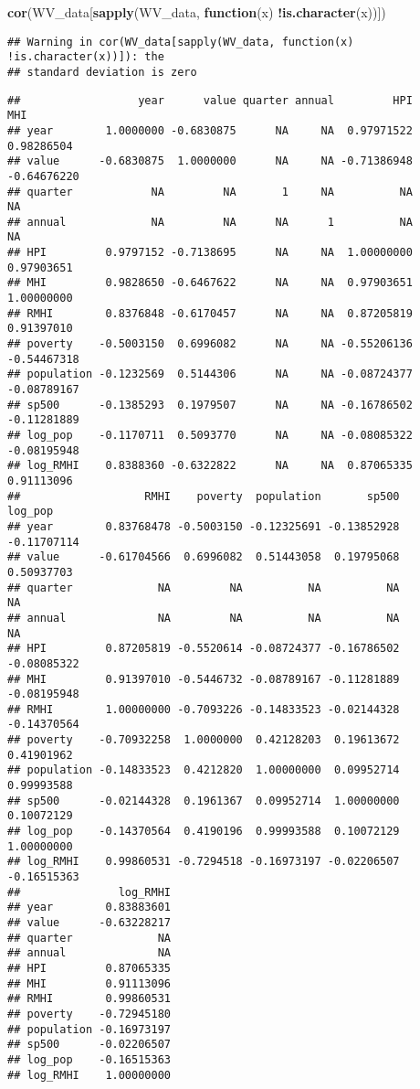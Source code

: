 \documentclass[
]{article}
\newenvironment{Shaded}{\begin{snugshade}}{\end{snugshade}}
\newcommand{\ControlFlowTok}[1]{\textcolor[rgb]{0.13,0.29,0.53}{\textbf{#1}}}
\newcommand{\KeywordTok}[1]{\textcolor[rgb]{0.13,0.29,0.53}{\textbf{#1}}}
\newcommand{\NormalTok}[1]{#1}
\newcommand{\OperatorTok}[1]{\textcolor[rgb]{0.81,0.36,0.00}{\textbf{#1}}}
\begin{document}
\begin{Shaded}
\begin{Highlighting}[]
\KeywordTok{cor}\NormalTok{(WV_data[}\KeywordTok{sapply}\NormalTok{(WV_data, }\ControlFlowTok{function}\NormalTok{(x) }\OperatorTok{!}\KeywordTok{is.character}\NormalTok{(x))])}
\end{Highlighting}
\end{Shaded}

\begin{verbatim}
## Warning in cor(WV_data[sapply(WV_data, function(x) !is.character(x))]): the
## standard deviation is zero
\end{verbatim}

\begin{verbatim}
##                  year      value quarter annual         HPI         MHI
## year        1.0000000 -0.6830875      NA     NA  0.97971522  0.98286504
## value      -0.6830875  1.0000000      NA     NA -0.71386948 -0.64676220
## quarter            NA         NA       1     NA          NA          NA
## annual             NA         NA      NA      1          NA          NA
## HPI         0.9797152 -0.7138695      NA     NA  1.00000000  0.97903651
## MHI         0.9828650 -0.6467622      NA     NA  0.97903651  1.00000000
## RMHI        0.8376848 -0.6170457      NA     NA  0.87205819  0.91397010
## poverty    -0.5003150  0.6996082      NA     NA -0.55206136 -0.54467318
## population -0.1232569  0.5144306      NA     NA -0.08724377 -0.08789167
## sp500      -0.1385293  0.1979507      NA     NA -0.16786502 -0.11281889
## log_pop    -0.1170711  0.5093770      NA     NA -0.08085322 -0.08195948
## log_RMHI    0.8388360 -0.6322822      NA     NA  0.87065335  0.91113096
##                   RMHI    poverty  population       sp500     log_pop
## year        0.83768478 -0.5003150 -0.12325691 -0.13852928 -0.11707114
## value      -0.61704566  0.6996082  0.51443058  0.19795068  0.50937703
## quarter             NA         NA          NA          NA          NA
## annual              NA         NA          NA          NA          NA
## HPI         0.87205819 -0.5520614 -0.08724377 -0.16786502 -0.08085322
## MHI         0.91397010 -0.5446732 -0.08789167 -0.11281889 -0.08195948
## RMHI        1.00000000 -0.7093226 -0.14833523 -0.02144328 -0.14370564
## poverty    -0.70932258  1.0000000  0.42128203  0.19613672  0.41901962
## population -0.14833523  0.4212820  1.00000000  0.09952714  0.99993588
## sp500      -0.02144328  0.1961367  0.09952714  1.00000000  0.10072129
## log_pop    -0.14370564  0.4190196  0.99993588  0.10072129  1.00000000
## log_RMHI    0.99860531 -0.7294518 -0.16973197 -0.02206507 -0.16515363
##               log_RMHI
## year        0.83883601
## value      -0.63228217
## quarter             NA
## annual              NA
## HPI         0.87065335
## MHI         0.91113096
## RMHI        0.99860531
## poverty    -0.72945180
## population -0.16973197
## sp500      -0.02206507
## log_pop    -0.16515363
## log_RMHI    1.00000000
\end{verbatim}
\end{document}
